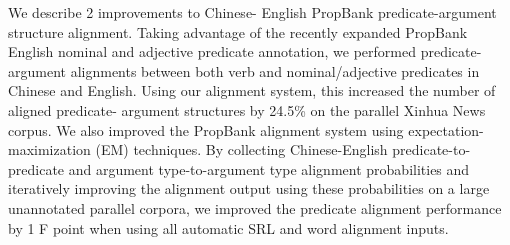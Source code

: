 We describe 2 improvements to Chinese- English PropBank predicate-argument structure alignment. Taking advantage of the recently expanded PropBank English nominal and adjective predicate annotation, we performed predicate- argument alignments between both verb and nominal/adjective predicates in Chinese and English. Using our alignment system, this increased the number of aligned predicate- argument structures by 24.5\% on the parallel Xinhua News corpus. We also improved the PropBank alignment system using expectation-maximization (EM) techniques. By collecting Chinese-English predicate-to- predicate and argument type-to-argument type alignment probabilities and iteratively improving the alignment output using these probabilities on a large unannotated parallel corpora, we improved the predicate alignment performance by 1 F point when using all automatic SRL and word alignment inputs.
